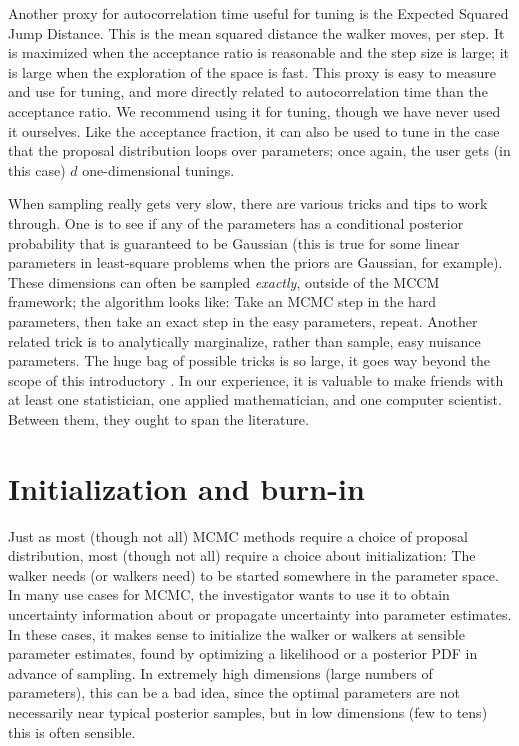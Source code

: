 \documentclass[12pt,twoside,pdftex]{article}
\begin{document}
Another proxy for autocorrelation time useful for tuning is the
  Expected Squared Jump Distance.
This is the mean squared distance the walker moves, per step.
It is maximized when the acceptance ratio is reasonable
  and the step size is large;
  it is large when the exploration of the space is fast.
This proxy is easy to measure and use for tuning,
  and more directly related to autocorrelation time than the acceptance ratio.
We recommend using it for tuning, though we have never used it ourselves.
Like the acceptance fraction, it can also be used to tune
  in the case that the proposal distribution loops over parameters;
  once again, the user gets (in this case) $d$ one-dimensional tunings.

When sampling really gets very slow,
  there are various tricks and tips to work through.
One is to see if any of the parameters has a conditional posterior
  probability that is guaranteed to be Gaussian
  (this is true for some linear parameters in least-square problems
  when the priors are Gaussian, for example).
These dimensions can often be sampled \emph{exactly},
  outside of the MCCM framework;
  the algorithm looks like:
Take an MCMC step in the hard parameters,
  then take an exact step in the easy parameters,
  repeat.
Another related trick is to analytically marginalize,
  rather than sample,
  easy nuisance parameters.
The huge bag of possible tricks is so large,
  it goes way beyond the scope of this introductory \documentname.
In our experience, it is valuable to make friends with at least one statistician,
  one applied mathematician, and one computer scientist.
Between them, they ought to span the literature.

\section{Initialization and burn-in}

Just as most (though not all) MCMC methods require a choice of proposal distribution,
  most (though not all) require a choice about initialization:
The walker needs (or walkers need) to be started somewhere in the parameter space.
In many use cases for MCMC,
  the investigator wants to use it to obtain uncertainty information about
  or propagate uncertainty into parameter estimates.
In these cases, it makes sense to initialize the walker or walkers at sensible parameter estimates,
  found by optimizing a likelihood or a posterior PDF in advance of sampling.
In extremely high dimensions (large numbers of parameters), this can be a bad idea,
  since the optimal parameters are not necessarily near typical posterior samples,
  but in low dimensions (few to tens) this is often sensible.
\end{document}
